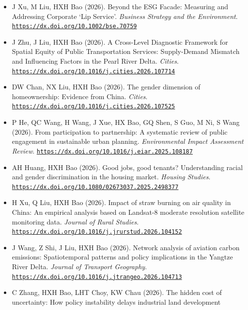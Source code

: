 \documentclass[11pt,a4paper]{article}
\providecommand{\tightlist}{%
  \setlength{\itemsep}{1pt}\setlength{\parskip}{0pt}}
\begin{document}
\begin{itemize}
\tightlist
\item
  J Xu, M Liu, HXH Bao (2026). Beyond the ESG Facade: Measuring and
  Addressing Corporate `Lip Service'. \emph{Business Strategy and the
  Environment}.
  \href{https://dx.doi.org/10.1002/bse.70759}{\nolinkurl{https://dx.doi.org/10.1002/bse.70759}}
\item
  J Zhu, J Liu, HXH Bao (2026). A Cross-Level Diagnostic Framework for
  Spatial Equity of Public Transportation Services: Supply-Demand
  Mismatch and Influencing Factors in the Pearl River Delta.
  \emph{Cities}.
  \href{https://dx.doi.org/10.1016/j.cities.2026.107714}{\nolinkurl{https://dx.doi.org/10.1016/j.cities.2026.107714}}
\item
  DW Chan, NX Liu, HXH Bao (2026). The gender dimension of
  homeownership: Evidence from China. \emph{Cities}.
  \href{https://dx.doi.org/10.1016/j.cities.2026.107525}{\nolinkurl{https://dx.doi.org/10.1016/j.cities.2026.107525}}
\item
  P He, QC Wang, H Wang, J Xue, HX Bao, GQ Shen, S Guo, M Ni, S Wang
  (2026). From participation to partnership: A systematic review of
  public engagement in sustainable urban planning. \emph{Environmental
  Impact Assessment Review}.
  \href{https://dx.doi.org/10.1016/j.eiar.2025.108187}{\nolinkurl{https://dx.doi.org/10.1016/j.eiar.2025.108187}}
\item
  AH Huang, HXH Bao (2026). Good jobs, good tenants? Understanding
  racial and gender discrimination in the housing market. \emph{Housing
  Studies}.
  \href{https://dx.doi.org/10.1080/02673037.2025.2498377}{\nolinkurl{https://dx.doi.org/10.1080/02673037.2025.2498377}}
\item
  H Xu, Q Liu, HXH Bao (2026). Impact of straw burning on air quality in
  China: An empirical analysis based on Landsat-8 moderate resolution
  satellite monitoring data. \emph{Journal of Rural Studies}.
  \href{https://dx.doi.org/10.1016/j.jrurstud.2026.104152}{\nolinkurl{https://dx.doi.org/10.1016/j.jrurstud.2026.104152}}
\item
  J Wang, Z Shi, J Liu, HXH Bao (2026). Network analysis of aviation
  carbon emissions: Spatiotemporal patterns and policy implications in
  the Yangtze River Delta. \emph{Journal of Transport Geography}.
  \href{https://dx.doi.org/10.1016/j.jtrangeo.2026.104713}{\nolinkurl{https://dx.doi.org/10.1016/j.jtrangeo.2026.104713}}
\item
  C Zhang, HXH Bao, LHT Choy, KW Chau (2026). The hidden cost of
  uncertainty: How policy instability delays industrial land development

\end{itemize}
\end{document}
